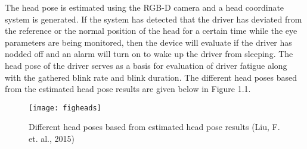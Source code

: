 The head pose is estimated using the RGB-D camera and a head coordinate system is generated. If the system has detected that the driver has deviated from the reference or the normal position of the head for a certain time while the eye parameters are being monitored, then the device will evaluate if the driver has nodded off and an alarm will turn on to wake up the driver from sleeping. The head pose of the driver serves as a basis for evaluation of driver fatigue along with the gathered blink rate and blink duration. The different head poses based from the estimated head pose results are given below in Figure 1.1.
\newline

\begin{figure}[ht]
	\centering
	\texttt{[image: figheads]}
	\caption{Different head poses based from estimated head pose results (Liu, F. et. al., 2015)}
\end{figure}


